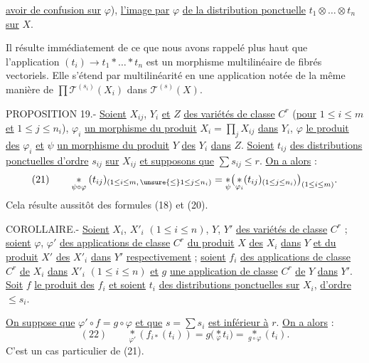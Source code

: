 
\uline{avoir de confusion sur} $\varphi$), \uline{l'image par} $\varphi$ \uline{de la distribution ponctuelle} $t_1\otimes\ldots\otimes t_n$ \uline{sur} $X$.

Il résulte immédiatement de ce que nous avons rappelé plus haut que l'application $(t_i)\longrightarrow t_1*\ldots*t_n$ est un morphisme multilinéaire de fibrés vectoriels. Elle s'étend par multilinéarité en une application notée de la même manière de $\prod\mathcal T^{(s_i)}(X_i)$ dans $\mathcal T^{(s)}(X)$.

PROPOSITION 19.- \uline{Soient} $X_{ij}$, $Y_i$ \uline{et} $Z$ \uline{des variétés de classe} $C^r$ (\uline{pour} $1\leq i\leq m$ \uline{et} $1\leq j\leq n_i$), $\varphi_i$ \uline{un morphisme du produit} $X_i=\prod_j X_{ij}$ \uline{dans} $Y_i$, $\varphi$ \uline{le produit des} $\varphi_i$ \uline{et} $\psi$ \uline{un morphisme du produit} $Y$ \uline{des} $Y_i$ \uline{dans} $Z$. \uline{Soient} $t_{ij}$ \uline{des distributions ponctuelles d'ordre} $s_{ij}$ \uline{sur} $X_{ij}$ \uline{et supposons que} $\sum s_{ij}\leq r$. \uline{On a alors} :
\[
(21)\qquad
\underset{\psi\circ\varphi}{*}(t_{ij})_{(1\leq i\leq m,\,\unsure{\leq}1\leq j\leq n_i)}
=\underset{\psi}{*}\bigl(\underset{\varphi_i}{*}(t_{ij})_{(1\leq j\leq n_i)}\bigr)_{(1\leq i\leq m)}.
\]
Cela résulte aussitôt des formules (18) et (20).

COROLLAIRE.- \uline{Soient} $X_i$, $X'_i$ $(1\leq i\leq n)$, $Y$, $Y'$ \uline{des variétés de classe} $C^r$ ; \uline{soient} $\varphi$, $\varphi'$ \uline{des applications de classe} $C^r$ \uline{du produit} $X$ \uline{des} $X_i$ \uline{dans} $Y$ \uline{et du produit} $X'$ \uline{des} $X'_i$ \uline{dans} $Y'$ \uline{respectivement} ; \uline{soient} $f_i$ \uline{des applications de classe} $C^r$ \uline{de} $X_i$ \uline{dans} $X'_i$ $(1\leq i\leq n)$ \uline{et} $g$ \uline{une application de classe} $C^r$ \uline{de} $Y$ \uline{dans} $Y'$. \uline{Soit} $f$ \uline{le produit des} $f_i$ \uline{et soient} $t_i$ \uline{des distributions ponctuelles sur} $X_i$, \uline{d'ordre} $\leq s_i$.

\uline{On suppose que} $\varphi'\circ f=g\circ\varphi$ \uline{et que} $s=\sum s_i$ \uline{est inférieur à} $r$. \uline{On a alors} :
\[
(22)\qquad
\underset{\varphi'}{*}(f_{i*}(t_i))=g\bigl(\underset{\varphi}{*}t_i\bigr)=\underset{g\circ\varphi}{*}(t_i).
\]
C'est un cas particulier de (21).
